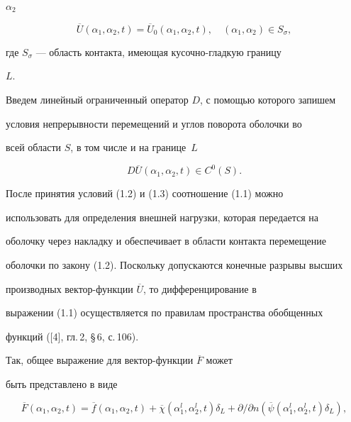 $\alpha_{2}$


\begin{equation}


\overline U(\alpha_{1},\alpha_{2},t)=


\overline U_{0}(\alpha_{1},\alpha_{2},t),


\quad (\alpha_{1},\alpha_{2})\in S_{\sigma},


\tag{1.2}


\end{equation} 


где $S_{\sigma}$ --- область контакта, имеющая кусочно-гладкую границу


$L$.





Введем линейный ограниченный оператор $D$, с помощью которого запишем


условия непрерывности перемещений и углов поворота оболочки во


всей области $S$, в том числе и на границе~$L$


\begin{equation}


D \overline U(\alpha_{1},\alpha_{2},t)\in C^{0}(S).


\tag{1.3}


\end{equation}


После принятия условий (1.2) и (1.3) соотношение (1.1) можно


использовать для определения внешней нагрузки, которая передается на


оболочку через накладку и обеспечивает в области контакта перемещение


оболочки по закону (1.2). Поскольку допускаются конечные разрывы высших


производных вектор-функции $\overline U$, то дифференцирование в


выражении (1.1) осуществляется по правилам пространства обобщенных


функций ([4], гл.\,2, \S\,6, с.\,106).


Так, общее выражение для вектор-функции $\overline F$ может


быть представлено в виде


\begin{equation}


\overline F (\alpha_{1},\alpha_{2},t)=


\overline f(\alpha_{1},\alpha_{2},t)+


\overline{\chi}(\alpha_{1}^{l},\alpha_{2}^{l},t)\delta_{L}+


\partial/\partial


n(\overline {\psi}(\alpha_{1}^{l},\alpha_{2}^{l},t)\delta_{L}),


\tag{1.4}


\end{equation}


